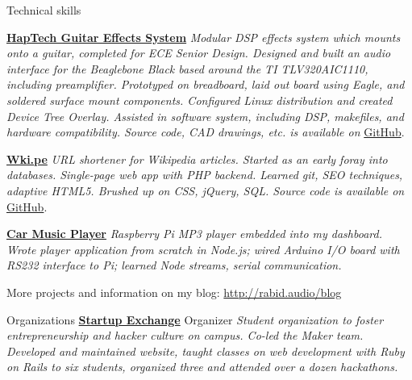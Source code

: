 \documentclass[a4paper,12pt]{article}
\begin{document}
\begin{resumeblock}{Technical skills}
{{{\bf \href{http://2015.staticshowdown.com/teams/team32}{HapTech Guitar Effects System}}\newline
\textit{Modular DSP effects system which mounts onto a guitar, completed for ECE Senior Design.
    Designed and built an audio interface for the Beaglebone Black based around the TI TLV320AIC1110,
    including preamplifier. Prototyped on breadboard, laid out board using Eagle, and soldered surface mount components.
    Configured Linux distribution and created Device Tree Overlay.
    Assisted in software system, including DSP, makefiles, and hardware compatibility. 
    Source code, CAD drawings, etc. is available on} \href{https://github.com/KMarino/HapTechSeniorDesign}{GitHub}.
\smallskip

{\bf \href{http://wki.pe/\#!/faq}{Wki.pe}}\newline
\textit{URL shortener for Wikipedia articles.
   Started as an early foray into databases.
   Single-page web app with PHP backend.
   Learned git, SEO techniques, adaptive HTML5.
   Brushed up on CSS, jQuery, SQL.
   Source code is available on} \href{https://github.com/rabidaudio/wkipe}{GitHub}.
\smallskip

{\bf \href{http://blog.rabidaudio.com/search/label/car\%20audio}{Car Music Player}}
\newline
\textit{Raspberry Pi MP3 player embedded into my dashboard.
    Wrote player application from scratch in Node.js;
    wired Arduino I/O board with RS232 interface to Pi;
    learned Node streams, serial communication.
}
\smallskip

More projects and information on my blog: \scriptsize{\url{http://rabid.audio/blog}}
}}
\end{resumeblock}


\begin{resumeblock}{Organizations}
{{\footnotesize \textbf{ \href{http://startupexchange.gatech.edu/}{Startup Exchange} }}}\newline
\footnotesize{Organizer \hspace{.1in}%
\textit{
    Student organization to foster entrepreneurship and hacker culture on campus. Co-led the Maker team.
    Developed and maintained website, taught classes on web development with Ruby on Rails to six students,
    organized three and attended over a dozen hackathons.
}}
\end{resumeblock}
\end{document}
